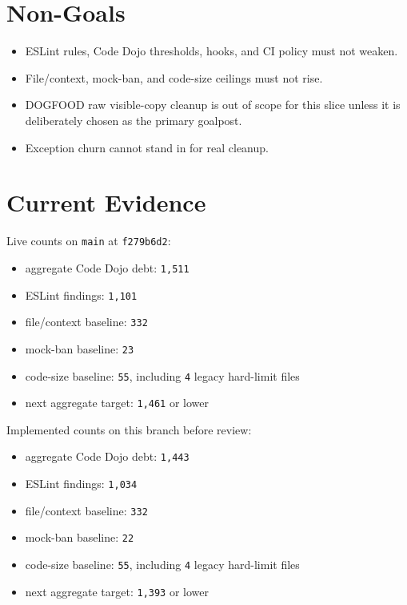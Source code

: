 \section{Non-Goals}\label{record-227-non-goals}

\begin{itemize}
\tightlist
\item
  ESLint rules, Code Dojo thresholds, hooks, and CI policy must not weaken.
\item
  File/context, mock-ban, and code-size ceilings must not rise.
\item
  DOGFOOD raw visible-copy cleanup is out of scope for this slice unless it is deliberately chosen as the primary goalpost.
\item
  Exception churn cannot stand in for real cleanup.
\end{itemize}

\section{Current Evidence}\label{record-227-current-evidence}

Live counts on \texttt{m\allowbreak{}a\allowbreak{}i\allowbreak{}n} at \texttt{f\allowbreak{}2\allowbreak{}7\allowbreak{}9\allowbreak{}b\allowbreak{}6\allowbreak{}d\allowbreak{}2}:

\begin{itemize}
\tightlist
\item
  aggregate Code Dojo debt: \texttt{1\allowbreak{},\allowbreak{}5\allowbreak{}1\allowbreak{}1}
\item
  ESLint findings: \texttt{1\allowbreak{},\allowbreak{}1\allowbreak{}0\allowbreak{}1}
\item
  file/context baseline: \texttt{3\allowbreak{}3\allowbreak{}2}
\item
  mock-ban baseline: \texttt{2\allowbreak{}3}
\item
  code-size baseline: \texttt{5\allowbreak{}5}, including \texttt{4} legacy hard-limit files
\item
  next aggregate target: \texttt{1\allowbreak{},\allowbreak{}4\allowbreak{}6\allowbreak{}1} or lower
\end{itemize}

Implemented counts on this branch before review:

\begin{itemize}
\tightlist
\item
  aggregate Code Dojo debt: \texttt{1\allowbreak{},\allowbreak{}4\allowbreak{}4\allowbreak{}3}
\item
  ESLint findings: \texttt{1\allowbreak{},\allowbreak{}0\allowbreak{}3\allowbreak{}4}
\item
  file/context baseline: \texttt{3\allowbreak{}3\allowbreak{}2}
\item
  mock-ban baseline: \texttt{2\allowbreak{}2}
\item
  code-size baseline: \texttt{5\allowbreak{}5}, including \texttt{4} legacy hard-limit files
\item
  next aggregate target: \texttt{1\allowbreak{},\allowbreak{}3\allowbreak{}9\allowbreak{}3} or lower
\end{itemize}

